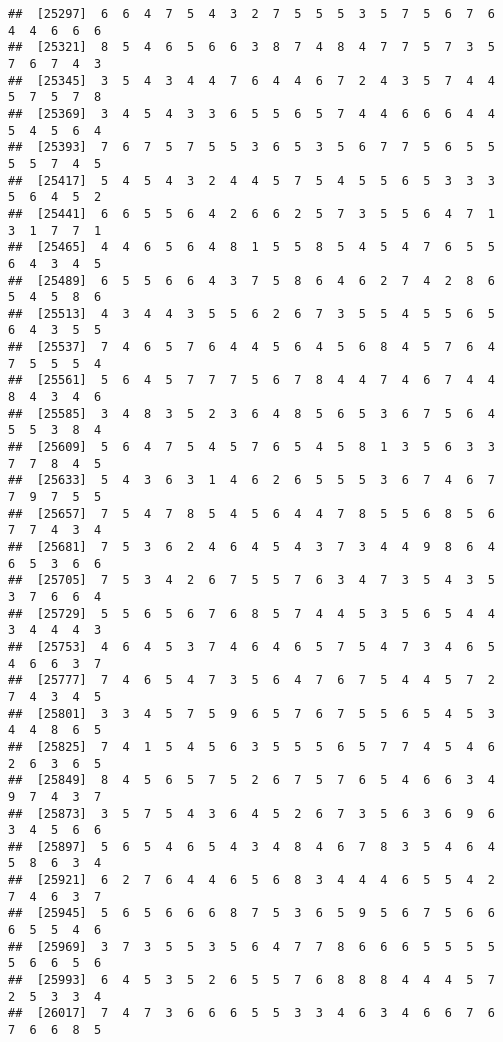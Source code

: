 \documentclass[
]{book}
\begin{document}
\begin{verbatim}
##  [25297]  6  6  4  7  5  4  3  2  7  5  5  5  3  5  7  5  6  7  6  4  4  6  6  6
##  [25321]  8  5  4  6  5  6  6  3  8  7  4  8  4  7  7  5  7  3  5  7  6  7  4  3
##  [25345]  3  5  4  3  4  4  7  6  4  4  6  7  2  4  3  5  7  4  4  5  7  5  7  8
##  [25369]  3  4  5  4  3  3  6  5  5  6  5  7  4  4  6  6  6  4  4  5  4  5  6  4
##  [25393]  7  6  7  5  7  5  5  3  6  5  3  5  6  7  7  5  6  5  5  5  5  7  4  5
##  [25417]  5  4  5  4  3  2  4  4  5  7  5  4  5  5  6  5  3  3  3  5  6  4  5  2
##  [25441]  6  6  5  5  6  4  2  6  6  2  5  7  3  5  5  6  4  7  1  3  1  7  7  1
##  [25465]  4  4  6  5  6  4  8  1  5  5  8  5  4  5  4  7  6  5  5  6  4  3  4  5
##  [25489]  6  5  5  6  6  4  3  7  5  8  6  4  6  2  7  4  2  8  6  5  4  5  8  6
##  [25513]  4  3  4  4  3  5  5  6  2  6  7  3  5  5  4  5  5  6  5  6  4  3  5  5
##  [25537]  7  4  6  5  7  6  4  4  5  6  4  5  6  8  4  5  7  6  4  7  5  5  5  4
##  [25561]  5  6  4  5  7  7  7  5  6  7  8  4  4  7  4  6  7  4  4  8  4  3  4  6
##  [25585]  3  4  8  3  5  2  3  6  4  8  5  6  5  3  6  7  5  6  4  5  5  3  8  4
##  [25609]  5  6  4  7  5  4  5  7  6  5  4  5  8  1  3  5  6  3  3  7  7  8  4  5
##  [25633]  5  4  3  6  3  1  4  6  2  6  5  5  5  3  6  7  4  6  7  7  9  7  5  5
##  [25657]  7  5  4  7  8  5  4  5  6  4  4  7  8  5  5  6  8  5  6  7  7  4  3  4
##  [25681]  7  5  3  6  2  4  6  4  5  4  3  7  3  4  4  9  8  6  4  6  5  3  6  6
##  [25705]  7  5  3  4  2  6  7  5  5  7  6  3  4  7  3  5  4  3  5  3  7  6  6  4
##  [25729]  5  5  6  5  6  7  6  8  5  7  4  4  5  3  5  6  5  4  4  3  4  4  4  3
##  [25753]  4  6  4  5  3  7  4  6  4  6  5  7  5  4  7  3  4  6  5  4  6  6  3  7
##  [25777]  7  4  6  5  4  7  3  5  6  4  7  6  7  5  4  4  5  7  2  7  4  3  4  5
##  [25801]  3  3  4  5  7  5  9  6  5  7  6  7  5  5  6  5  4  5  3  4  4  8  6  5
##  [25825]  7  4  1  5  4  5  6  3  5  5  5  6  5  7  7  4  5  4  6  2  6  3  6  5
##  [25849]  8  4  5  6  5  7  5  2  6  7  5  7  6  5  4  6  6  3  4  9  7  4  3  7
##  [25873]  3  5  7  5  4  3  6  4  5  2  6  7  3  5  6  3  6  9  6  3  4  5  6  6
##  [25897]  5  6  5  4  6  5  4  3  4  8  4  6  7  8  3  5  4  6  4  5  8  6  3  4
##  [25921]  6  2  7  6  4  4  6  5  6  8  3  4  4  4  6  5  5  4  2  7  4  6  3  7
##  [25945]  5  6  5  6  6  6  8  7  5  3  6  5  9  5  6  7  5  6  6  6  5  5  4  6
##  [25969]  3  7  3  5  5  3  5  6  4  7  7  8  6  6  6  5  5  5  5  5  6  6  5  6
##  [25993]  6  4  5  3  5  2  6  5  5  7  6  8  8  8  4  4  4  5  7  2  5  3  3  4
##  [26017]  7  4  7  3  6  6  6  5  5  3  3  4  6  3  4  6  6  7  6  7  6  6  8  5

\end{verbatim}
\end{document}

